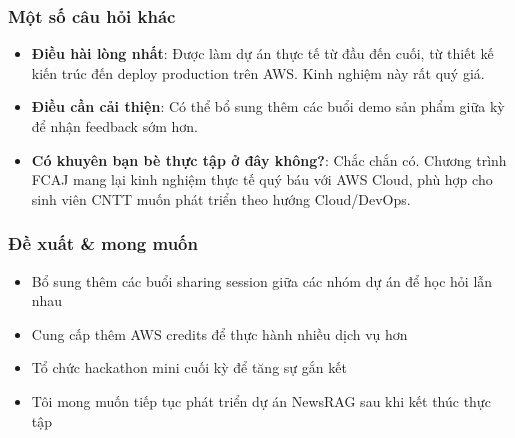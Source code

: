 \hypertarget{mux1ed9t-sux1ed1-cuxe2u-hux1ecfi-khuxe1c}{%
\subsubsection{Một số câu hỏi
khác}}

\begin{itemize}
\tightlist
\item
  \textbf{Điều hài lòng nhất}: Được làm dự án thực tế từ đầu đến cuối,
  từ thiết kế kiến trúc đến deploy production trên AWS. Kinh nghiệm này
  rất quý giá.
\item
  \textbf{Điều cần cải thiện}: Có thể bổ sung thêm các buổi demo sản
  phẩm giữa kỳ để nhận feedback sớm hơn.
\item
  \textbf{Có khuyên bạn bè thực tập ở đây không?}: Chắc chắn có. Chương
  trình FCAJ mang lại kinh nghiệm thực tế quý báu với AWS Cloud, phù hợp
  cho sinh viên CNTT muốn phát triển theo hướng Cloud/DevOps.
\end{itemize}

\hypertarget{ux111ux1ec1-xuux1ea5t-mong-muux1ed1n}{%
\subsubsection{Đề xuất \& mong
muốn}}

\begin{itemize}
\tightlist
\item
  Bổ sung thêm các buổi sharing session giữa các nhóm dự án để học hỏi
  lẫn nhau
\item
  Cung cấp thêm AWS credits để thực hành nhiều dịch vụ hơn
\item
  Tổ chức hackathon mini cuối kỳ để tăng sự gắn kết
\item
  Tôi mong muốn tiếp tục phát triển dự án NewsRAG sau khi kết thúc thực
  tập
\end{itemize}
